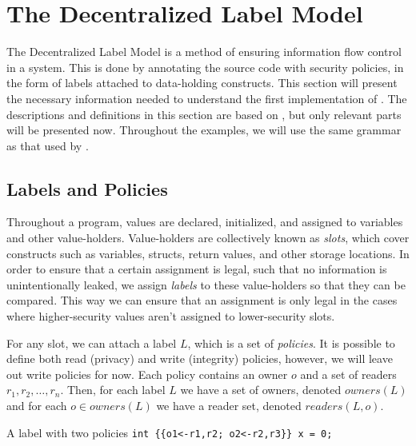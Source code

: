 
\section{The Decentralized Label Model}
The Decentralized Label Model \cite{myers1997, myers1998, myers2000} is a method of ensuring information flow control in a system.
This is done by annotating the source code with security policies, in the form of labels attached to data-holding constructs.
This section will present the necessary information needed to understand the first implementation of \thetool.
The descriptions and definitions in this section are based on \cite{myers1997, myers1998, myers2000}, but only relevant parts will be presented now.
Throughout the examples, we will use the same grammar as that used by \thetool.

\subsection{Labels and Policies}
Throughout a program, values are declared, initialized, and assigned to variables and other value-holders.
Value-holders are collectively known as \emph{slots}, which cover constructs such as variables, structs, return values, and other storage locations.
In order to ensure that a certain assignment is legal, such that no information is unintentionally leaked, we assign \emph{labels} to these value-holders so that they can be compared.
This way we can ensure that an assignment is only legal in the cases where higher-security values aren't assigned to lower-security slots.

For any slot, we can attach a label $L$, which is a set of \emph{policies}.
It is possible to define both read (privacy) and write (integrity) policies, however, we will leave out write policies for now.
Each policy contains an owner $o$ and a set of readers $r_1,r_2,\dots,r_n$.
Then, for each label $L$ we have a set of owners, denoted $owners(L)$ and for each $o \in owners(L)$ we have a reader set, denoted $readers(L, o)$.

\begin{example}{A label with two policies}
  \texttt{int \{\{o1<-r1,r2; o2<-r2,r3\}\} x = 0;}
\end{example}
